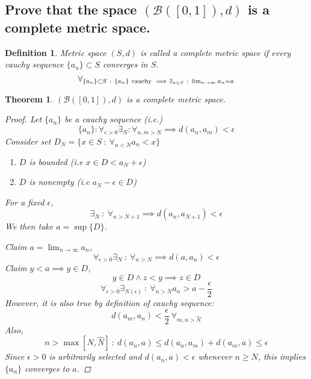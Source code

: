\documentclass[]{article}
\newcommand{\st}{\ : \ }
\newtheorem{definition}{Definition}
\newtheorem{theorem}{Theorem}
\begin{document}
\subsection{Prove that the space $(\mathcal{B}([0,1]),d)$ is a complete metric space.}
\begin{definition}
    Metric space $(S,d)$ is called a \emph{complete metric space} if every cauchy sequence $\{a_n\}\subset S$ converges in $S$.
    \[\forall_{\{a_n\}\subset S \st \{a_n\} \ \textnormal{cauchy} \ \implies \exists_{a \in S} \st \lim_{n\to\infty} a_n = a}\]
\end{definition}
\begin{theorem}
    $(\mathcal{B}([0,1]),d)$ is a complete metric space.
    \begin{proof}
        Let $\{a_n\}$ be a cauchy sequence (i.e.)
        \[\{a_n\} : \forall_{\epsilon>0} \exists_{N} : \forall_{n,m > N} \implies d(a_n,a_m) < \epsilon\]
        Consider set $D_N = \{x \in S \st \forall_{n < N} a_n < x\}$
        \begin{enumerate}
            \item $D$ is bounded (i.e $x \in D < a_N + \epsilon$)
            \item $D$ is nonempty (i.e $a_N - \epsilon \in D$)
        \end{enumerate}
        For a fixed $\epsilon$, 
        \[\exists_{N} \st \forall_{n > N + 1} \implies d(a_n, a_{N+1}) < \epsilon\]
        We then take $a = \sup\{D\}$.

        Claim $a = \lim_{n\to\infty} a_n$,
        \[\forall_{\epsilon>0} \exists_N \st \forall_{n>N} \implies d(a,a_n) < \epsilon\]
        Claim $y < a \implies y \in D$,
        \[y \in D \land z < y \implies z \in D\]
        \[\forall_{\epsilon>0} \exists_{N(\epsilon)} \st \forall_{n>N} a_n > a - \frac{\epsilon}{2}\]
        However, it is also true by definition of cauchy sequence: 
        \[d(a_m, a_n) < \frac{\epsilon}{2} \ \forall_{m,n > \hat{N}}\]
        Also,
        \[n > \max[N,\hat{N}] \st d(a_n,a) \leq d(a_n,a_m) + d(a_m,a) \leq \epsilon\]
        Since $\epsilon>0$ is arbitrarily selected and $d(a_n,a) < \epsilon$ whenever $n\geq N$, this implies $\{a_n\}$ converges to $a$.
    \end{proof}
\end{theorem}

\newpage
\end{document}
